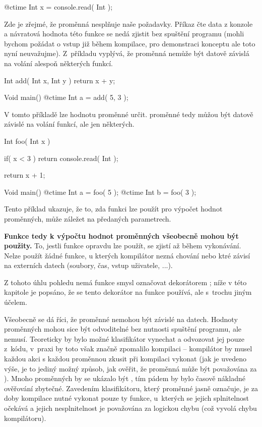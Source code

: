 \begin{code}
@ctime Int x = console.read( Int );
\end{code}

Zde je zřejmé, že proměnná  nesplňuje naše požadavky. Příkaz  čte data z konzole a návratová hodnota této funkce se nedá zjistit bez spuštění programu (mohli bychom požádat o vstup již během kompilace, pro demonstraci konceptu ale toto nyní neuvažujme). Z~příkladu vyplývá, že \ctime proměnná nemůže být datově závislá na volání alespoň některých funkcí.

\begin{code}
Int add( Int x, Int y ) {
	return x + y;
}

Void main() {
	@ctime Int a = add( 5, 3 );
}
\end{code}
V tomto příkladě lze hodnotu proměnné  určit. \ctime proměnné tedy můžou být datově závislé na volání funkcí, ale jen některých.

\begin{code}
Int foo( Int x ) {
	if( x < 3 )
		return console.read( Int );

	return x + 1;
}

Void main() {
	@ctime Int a = foo( 5 );
	@ctime Int b = foo( 3 );
}
\end{code}

Tento příklad ukazuje, že to, zda funkci lze použít pro výpočet hodnot \ctime proměnných, může záležet na předaných parametrech.

\textbf{Funkce tedy k výpočtu hodnot \ctime proměnných všeobecně mohou být použity.} To, jestli funkce opravdu lze použít, se zjistí až během vykonávání. Nelze použít žádné funkce, u kterých kompilátor nezná chování nebo ktré závisí na externích datech (soubory, čas, vstup uživatele, ...).

Z tohoto úhlu pohledu nemá funkce smysl označovat dekorátorem ; níže v této kapitole je popsáno, že se tento dekorátor na funkce používá, ale s~trochu jiným účelem.

Všeobecně se dá říci, že \ctime proměnné nemohou být závislé na \nonctime datech. Hodnoty \nonctime proměnných mohou sice být odvoditelné bez nutnosti spuštění programu, ale nemusí. Teoreticky by bylo možné klasifikátor vynechat a odvozovat jej pouze z~kódu, v~praxi by toto však značně zpomalilo kompilaci -- kompilátor by musel každou akci s každou proměnnou zkusit při kompilaci vykonat (jak je uvedeno výše, je to jediný možný způsob, jak ověřit, že proměnná může být považována za \ctime). Mnoho proměnných by se ukázalo být \nonctime, tím pádem by bylo časově nákladné ověřování zbytečné. Zavedením klasifikátoru, který \ctime proměnné jasně označuje, je za doby kompilace nutné vykonat pouze ty funkce, u~kterých se jejich splnitelnost očekává a jejich nesplnitelnost je považována za logickou chybu (což vyvolá chybu kompilátoru).

